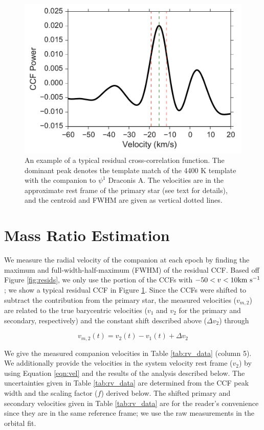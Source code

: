 \documentclass[twocolumn]{emulateapj}
\begin{document}
\begin{figure}
  \centering
  \includegraphics[width=\columnwidth]{Typical_CCF.pdf}
  \caption{An example of a typical residual cross-correlation function. The dominant peak denotes the template match of the 4400 K template with the companion to $\psi^1$ Draconis A. The velocities are in the approximate rest frame of the primary star (see text for details), and the centroid and FWHM are given as vertical dotted lines.}
  \label{fig:ccf_typical}
\end{figure}



\section{Mass Ratio Estimation}
\label{sec:orbit}

We measure the radial velocity of the companion at each epoch by finding the maximum and full-width-half-maximum (FWHM) of the residual CCF. Based off Figure \ref{fig:resids}, we only use the portion of the CCFs with $-50 < v < 10 \rm km\ s^{-1}$; we show a typical residual CCF in Figure \ref{fig:ccf_typical}. Since the CCFs were shifted to subtract the contribution from the primary star, the measured velocities ($v_{m, 2}$) are related to the true barycentric velocities ($v_1$ and $v_2$ for the primary and secondary, respectively) and the constant shift described above ($\Delta v_2$) through

\begin{equation}
v_{m, 2}(t) = v_2(t) - v_1(t) + \Delta v_2
\label{eqn:vel}
\end{equation}

We give the measured companion velocities in Table \ref{tab:rv_data} (column 5). We additionally provide the velocities in the system velocity rest frame ($v_2$) by using Equation \ref{eqn:vel} and the results of the analysis described below. The uncertainties given in Table \ref{tab:rv_data} are determined from the CCF peak width and the scaling factor ($f$) derived below. The shifted primary and secondary velocities given in Table \ref{tab:rv_data} are for the reader's convenience since they are in the same reference frame; we use the raw measurements in the orbital fit.
\end{document}
